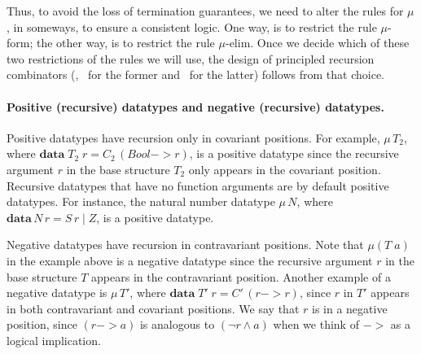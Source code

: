 Thus, to avoid the loss of termination guarantees, we need to alter the rules
for $\mu$, in someways, to ensure a consistent logic. One way, is to restrict
the rule {\small $\mu$-form}; the other way, is to restrict the rule
{\small $\mu$-elim}. Once we decide which of these two restrictions of the
rules we will use, the design of principled recursion combinators (\eg, \It\
for the former and \MIt\ for the latter) follows from that choice.

\paragraph{Positive (recursive) datatypes and negative (recursive) datatypes.}
Positive datatypes have recursion only in covariant positions.
For example, $\mu\,T_2$, where $\textbf{data}\;T_2 \; r = C_2\,(Bool -> r)$,
is a positive datatype since the recursive argument $r$ in
the base structure $T_2$ only appears in the covariant position.
Recursive datatypes that have no function arguments are by default
positive datatypes. For instance, the natural number datatype $\mu\,N$,
where $\textbf{data}\,N\,r=S\,r \mid Z$, is a positive datatype.

Negative datatypes have recursion in contravariant positions.
Note that $\mu(T\;a)$ in the example above is a negative datatype
since the recursive argument $r$ in the base structure $T$ appears
in the contravariant position. Another example of a negative datatype is
$\mu\,T'$, where $\textbf{data}\;T'\;r = C'\,(r -> r)$, since $r$ in $T'$
appears in both contravariant and covariant positions.
We say that $r$ is in a negative position, since $(r -> a)$ is analogous to
$(\neg r \land a)$ when we think of $->$ as a logical implication.


